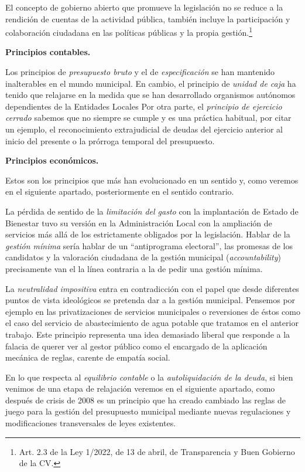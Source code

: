 \documentclass[
]{article}
\begin{document}
El concepto de gobierno abierto que promueve la legislación no se reduce
a la rendición de cuentas de la actividad pública, también incluye la
participación y colaboración ciudadana en las políticas públicas y la
propia gestión.\footnote{Art. 2.3 de la Ley 1/2022, de 13 de abril, de
  Transparencia y Buen Gobierno de la CV.}

\textbf{Principios contables.}

Los principios de \emph{presupuesto bruto} y el de \emph{especificación}
se han mantenido inalterables en el mundo municipal. En cambio, el
principio de \emph{unidad de caja} ha tenido que relajarse en la medida
que se han desarrollado organismos autónomos dependientes de la
Entidades Locales Por otra parte, el \emph{principio de ejercicio
cerrado} sabemos que no siempre se cumple y es una práctica habitual,
por citar un ejemplo, el reconocimiento extrajudicial de deudas del
ejercicio anterior al inicio del presente o la prórroga temporal del
presupuesto.

\textbf{Principios económicos.}

Estos son los principios que más han evolucionado en un sentido y, como
veremos en el siguiente apartado, posteriormente en el sentido
contrario.

La pérdida de sentido de la \emph{limitación del gasto} con la
implantación de Estado de Bienestar tuvo su versión en la Administración
Local con la ampliación de servicios más allá de los estrictamente
obligados por la legislación. Hablar de la \emph{gestión mínima} sería
hablar de un ``antiprograma electoral'', las promesas de los candidatos
y la valoración ciudadana de la gestión municipal
(\emph{accountability}) precisamente van el la línea contraria a la de
pedir una gestión mínima.

La \emph{neutralidad impositiva} entra en contradicción con el papel que
desde diferentes puntos de vista ideológicos se pretenda dar a la
gestión municipal. Pensemos por ejemplo en las privatizaciones de
servicios municipales o reversiones de éstos como el caso del servicio
de abastecimiento de agua potable que tratamos en el anterior trabajo.
Este principio representa una idea demasiado liberal que responde a la
falacia de querer ver al gestor público como el encargado de la
aplicación mecánica de reglas, carente de empatía social.

En lo que respecta al \emph{equilibrio contable} o la
\emph{autoliquidación de la deuda}, si bien venimos de una etapa de
relajación veremos en el siguiente apartado, como después de crisis de
2008 es un principio que ha creado cambiado las reglas de juego para la
gestión del presupuesto municipal mediante nuevas regulaciones y
modificaciones transversales de leyes existentes.
\end{document}
